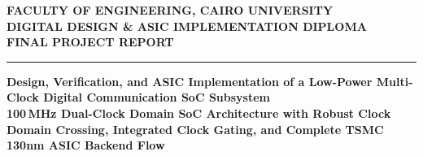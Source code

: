 \documentclass[11pt,a4paper]{article}
\begin{document}
\begin{titlepage}
\centering
\vspace*{-1.0cm}

\begin{center}
    {\large \textbf{\textcolor{accent}{FACULTY OF ENGINEERING, CAIRO UNIVERSITY}}}\\[0.15cm]
    {\normalsize \textbf{DIGITAL DESIGN \& ASIC IMPLEMENTATION DIPLOMA}}\\[0.15cm]
    {\small \textbf{FINAL PROJECT REPORT}}
\end{center}

\vspace{0.3cm}
{\color{primary}\rule{\textwidth}{1.8pt}}
\vspace{0.6cm}

\begin{tcolorbox}[
    enhanced,
    colback=bannerbg,
    colframe=bannerbg,
    arc=3mm,
    boxrule=0pt,
    left=15pt,
    right=15pt,
    top=22pt,
    bottom=22pt
]
\raggedright
{\fontsize{23pt}{27pt}\selectfont \textbf{Design, Verification, and ASIC Implementation of a Low-Power Multi-Clock Digital Communication SoC Subsystem}}\\[0.4cm]
{\large \textcolor{accent}{\textbf{100\,MHz Dual-Clock Domain SoC Architecture with Robust Clock Domain Crossing, Integrated Clock Gating, and Complete TSMC 130nm ASIC Backend Flow}}}
\end{tcolorbox}

\vspace{0.8cm}


\end{titlepage}
\end{document}
